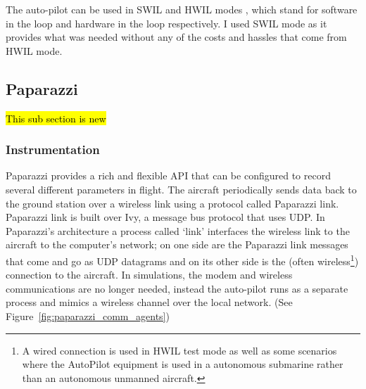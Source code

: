 The auto-pilot can be used in SWIL and HWIL modes \cite{melmoth2019true}, which stand for software in the loop and hardware in the loop respectively. I used SWIL mode as it provides what was needed without any of the costs and hassles that come from HWIL mode. 

\subsection{Paparazzi}\label{sec:paparazzi_data_collection}

\hl{This sub section is new}

\subsubsection{Instrumentation}
Paparazzi provides a rich and flexible API that can be configured to record several different parameters in flight. The aircraft periodically sends data back to the ground station over a wireless link using a protocol called Paparazzi link. Paparazzi link is built over Ivy, a message bus protocol that uses UDP. 
In Paparazzi's architecture a process called `link' interfaces the wireless link to the aircraft to the computer's network; on one side are the Paparazzi link messages that come and go as UDP datagrams and on its other side is the (often wireless\footnote{A wired connection is used in HWIL test mode as well as some scenarios where the AutoPilot equipment is used in a autonomous submarine rather than an autonomous unmanned aircraft.}) connection to the aircraft.
In simulations, the modem and wireless communications are no longer needed, instead the auto-pilot runs as a separate process and mimics a wireless channel over the local network. (See Figure~\ref{fig:paparazzi_comm_agents})


